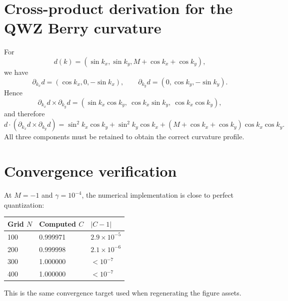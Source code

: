 \documentclass[11pt]{article}
\begin{document}
\appendix

\section{Cross-product derivation for the QWZ Berry curvature}

For
\[
d(k)=(\sin k_x,\sin k_y,M+\cos k_x+\cos k_y),
\]
we have
\[
\partial_{k_x}d=(\cos k_x,0,-\sin k_x),\qquad
\partial_{k_y}d=(0,\cos k_y,-\sin k_y).
\]
Hence
\[
\partial_{k_x}d\times \partial_{k_y}d
=\left(\sin k_x\cos k_y,\ \cos k_x\sin k_y,\ \cos k_x\cos k_y\right),
\]
and therefore
\[
d\cdot(\partial_{k_x}d\times \partial_{k_y}d)
=\sin^2k_x\cos k_y+\sin^2k_y\cos k_x
+(M+\cos k_x+\cos k_y)\cos k_x\cos k_y.
\]
All three components must be retained to obtain the correct curvature profile.

\section{Convergence verification}

At $M=-1$ and $\gamma=10^{-4}$, the numerical implementation is close to perfect quantization:
\begin{center}
\begin{tabular}{lll}
\toprule
Grid $N$ & Computed $C$ & $|C-1|$ \\
\midrule
100 & 0.999971 & $2.9\times 10^{-5}$ \\
200 & 0.999998 & $2.1\times 10^{-6}$ \\
300 & 1.000000 & $<10^{-7}$ \\
400 & 1.000000 & $<10^{-7}$ \\
\bottomrule
\end{tabular}
\end{center}
This is the same convergence target used when regenerating the figure assets.
\end{document}
